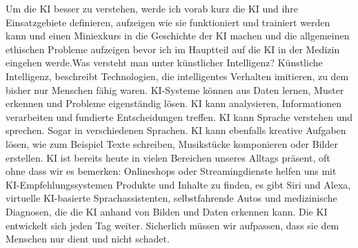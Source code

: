 \documentclass{article}
\begin{document}
Um die KI  besser zu verstehen, werde ich vorab kurz die KI und ihre Einsatzgebiete definieren, aufzeigen wie sie funktioniert und trainiert werden kann und einen Miniexkurs in die Geschichte der KI machen und die allgemeinen ethischen Probleme aufzeigen bevor ich im Hauptteil auf die KI in der Medizin eingehen werde.Was versteht man unter künstlicher Intelligenz? Künstliche Intelligenz, beschreibt Technologien, die intelligentes Verhalten imitieren, zu dem bisher nur Menschen fähig waren.
KI-Systeme  können aus Daten lernen, Muster erkennen und Probleme eigenständig lösen. KI kann analysieren, Informationen verarbeiten und fundierte Entscheidungen treffen. KI kann Sprache verstehen und sprechen. Sogar in verschiedenen Sprachen. KI kann ebenfalls kreative Aufgaben lösen, wie zum Beispiel Texte schreiben, Musikstücke komponieren oder Bilder erstellen.
KI ist bereits heute in vielen Bereichen unseres Alltags präsent, oft ohne dass wir es bemerken: Onlineshops oder Streamingdienste helfen uns mit KI-Empfehlungssystemen Produkte und Inhalte zu finden, es gibt Siri und Alexa, virtuelle KI-basierte Sprachassistenten, selbstfahrende Autos und medizinische Diagnosen, die die KI anhand von Bilden und Daten erkennen kann. Die KI entwickelt sich jeden Tag weiter. Sicherlich müssen wir aufpassen, dass sie dem Menschen nur dient und nicht schadet.
\end{document}
